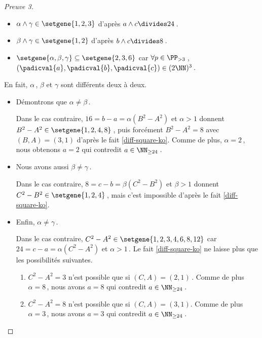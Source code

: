 \begin{proof}[Preuve 3]
\begin{itemize}
		\item $\alpha \wedge \gamma \in \setgene{1, 2, 3}$
		d'après $a \wedge c \divides 24$\,.

		\item $\beta \wedge \gamma \in \setgene{1, 2}$
		d'après $b \wedge c \divides 8$\,.

		\item $\setgene{\alpha, \beta, \gamma} \subseteq \setgene{2, 3, 6}$
		car $\forall p \in \PP_{>3}$\,, $(\padicval{a}, \padicval{b}, \padicval{c}) \in ( 2 \NN )^3$\,. 
    \end{itemize}
		
	\medskip

	En fait, $\alpha$\,, $\beta$ et $\gamma$ sont différents deux à deux.
	
    \begin{itemize}	
		\item Démontrons que $\alpha \neq \beta$\,. 
		
		\noindent
		Dans le cas contraire, $16 = b - a = \alpha(B^2 - A^2)$ et $\alpha > 1$ donnent $B^2 - A^2 \in \setgene{1, 2, 4, 8}$\,, puis forcément $B^2 - A^2 = 8$ avec $(B, A) = (3, 1)$ d'après le fait \ref{diff-square-ko}.
		Comme de plus, $\alpha = 2$\,, nous obtenons $a = 2$ qui contredit $a \in \NN_{\geq 24}$\,.		

		\item Nous avons aussi $\beta \neq \gamma$\,. 
		
		\noindent
		Dans le cas contraire, $8 = c - b = \beta(C^2 - B^2)$ et $\beta > 1$ donnent $C^2 - B^2 \in \setgene{1, 2, 4}$\,, mais c'est impossible d'après le fait \ref{diff-square-ko}.
		

		\item Enfin, $\alpha \neq \gamma$\,. 
		
		\noindent
		Dans le cas contraire,
		$C^2 - A^2 \in \setgene{1, 2, 3, 4, 6, 8, 12}$
		car 
		$24 = c - a = \alpha(C^2 - A^2)$ et $\alpha > 1$\,.
		Le fait \ref{diff-square-ko} ne laisse plus que les possibilités suivantes.
		\begin{enumerate}
			\item $C^2 - A^2 = 3$ n'est possible que si $(C, A) = (2, 1)$\,.
			Comme de plus $\alpha = 8$\,, nous avons $a = 8$ qui contredit $a \in \NN_{\geq 24}$\,.
			
			
			\item $C^2 - A^2 = 8$ n'est possible que si $(C, A) = (3, 1)$.
			Comme de plus $\alpha = 3$\,, nous avons $a = 3$ qui contredit $a \in \NN_{\geq 24}$\,.
			

\end{enumerate}
\end{itemize}
\end{proof}
